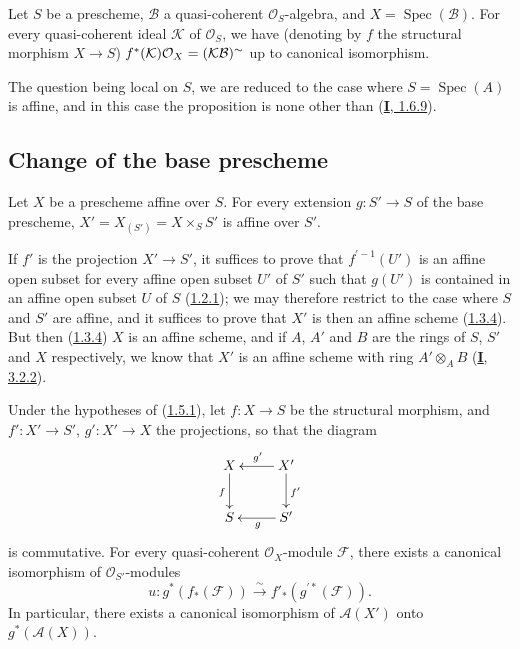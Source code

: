 \begin{proposition}[1.4.11]
\label{II.1.4.11}
Let $S$ be a prescheme, $\mathcal{B}$ a quasi-coherent
$\mathcal{O}_S$-algebra, and $X=\operatorname{Spec}(\mathcal{B})$. For every
quasi-coherent ideal $\mathcal{K}$ of $\mathcal{O}_S$, we have (denoting by
$f$ the structural morphism $X\to S$)
$f^*(\mathcal{K})\mathcal{O}_X=(\mathcal{K}\mathcal{B})^{\sim}$ up to
canonical isomorphism.
\end{proposition}

The question being local on $S$, we are reduced to the case where
$S=\operatorname{Spec}(A)$ is affine, and in this case the proposition is
none other than (\hyperref[I.1.6.9]{\textbf{I}, 1.6.9}).

\subsection{Change of the base prescheme}
\label{II.1.5}

\begin{proposition}[1.5.1]
\label{II.1.5.1}
Let $X$ be a prescheme affine over $S$. For every extension
$g:S'\to S$ of the base prescheme, $X'=X_{(S')}=X\times_S S'$ is affine
over $S'$.
\end{proposition}

If $f'$ is the projection $X'\to S'$, it suffices to prove that
$f^{\prime-1}(U')$ is an affine open subset for every affine open subset
$U'$ of $S'$ such that $g(U')$ is contained in an affine open subset $U$ of
$S$ (\hyperref[II.1.2.1]{1.2.1}); we may therefore restrict to the case
where $S$ and $S'$ are affine, and it suffices to prove that $X'$ is then an
affine scheme (\hyperref[II.1.3.4]{1.3.4}). But then
(\hyperref[II.1.3.4]{1.3.4}) $X$ is an affine scheme, and if $A$, $A'$
and $B$ are the rings of $S$, $S'$ and $X$ respectively, we know that $X'$
is an affine scheme with ring $A'\otimes_A B$
(\hyperref[I.3.2.2]{\textbf{I}, 3.2.2}).

\begin{corollary}[1.5.2]
\label{II.1.5.2}
Under the hypotheses of \textup{(\hyperref[II.1.5.1]{1.5.1})}, let $f:X\to S$
be the structural morphism, and $f':X'\to S'$, $g':X'\to X$ the projections,
so that the diagram
\[
  \xymatrix{
    X\ar[d]_{f} & X'\ar[l]_{g'}\ar[d]^{f'}\\
    S & S'\ar[l]^g
  }
\]
is commutative. For every quasi-coherent $\mathcal{O}_X$-module
$\mathcal{F}$, there exists a canonical isomorphism of
$\mathcal{O}_{S'}$-modules
\[
  u:g^*(f_*(\mathcal{F}))\xrightarrow{\sim}
  f'_*(g^{\prime*}(\mathcal{F})).
  \tag{1.5.2.1}\label{II.1.5.2.1}
\]
In particular, there exists a canonical isomorphism of $\mathcal{A}(X')$
onto $g^*(\mathcal{A}(X))$.
\end{corollary}

